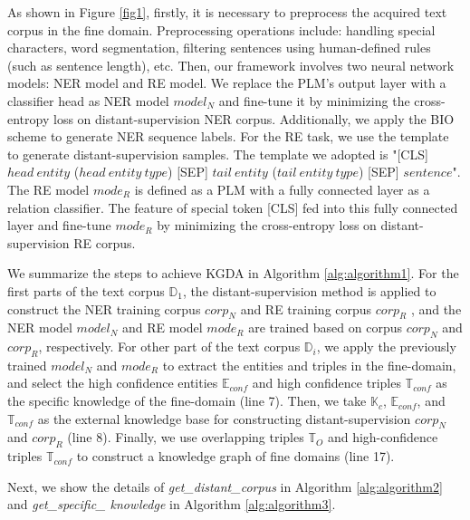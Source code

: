 \documentclass[sigconf]{acmart}
\begin{document}
As shown in Figure \ref{fig1}, firstly, it is necessary to preprocess the acquired text corpus in the fine domain. Preprocessing operations include: handling special characters, word segmentation, filtering sentences using human-defined rules (such as sentence length), etc. Then, our framework involves two neural network models: NER model and RE model. We replace the PLM’s output layer with a classifier head as  NER model $model_N$ and fine-tune it by minimizing the cross-entropy loss on distant-supervision NER corpus. Additionally, we apply the BIO scheme \cite{li2012joint} to generate NER sequence labels. For the RE task, we use the template to generate distant-supervision samples. The template we adopted is "[CLS] $head\ entity$ ($head\ entity\ type$) [SEP] $tail\ entity$ ($tail\ entity\ type$) [SEP] $sentence$". The RE model $mode_R$ is defined as a PLM with a fully connected layer as a relation classifier. The feature of special token [CLS]  fed into this fully connected layer and fine-tune $mode_R$ by minimizing the cross-entropy loss on distant-supervision RE corpus.

We summarize the steps to achieve KGDA in Algorithm  \ref{alg:algorithm1}. For the first parts of the text corpus $\mathbb{D}_1$, the distant-supervision method is applied to construct the NER training corpus $corp_N$ and RE training corpus $corp_R$ , and the NER model $model_N$ and RE model $mode_R$ are trained based on corpus $corp_N$ and $corp_R$, respectively. For other part of the text corpus $\mathbb{D}_i$,  we apply the previously trained $model_N$ and $mode_R$ to extract the entities and triples in the fine-domain, and select the  high confidence entities $\mathbb{E}_{conf}$ and  high confidence triples $\mathbb{T}_{conf}$ as the specific knowledge of the fine-domain (line 7). Then, we take $\mathbb{K}_c$, $\mathbb{E}_{conf}$, and $\mathbb{T}_{conf}$  as the external knowledge base for constructing distant-supervision $corp_N$ and $corp_R$ (line 8). Finally, we use overlapping triples $\mathbb{T}_O$ and high-confidence triples $\mathbb{T}_{conf}$  to construct a knowledge graph of fine domains (line 17).

Next, we show the details of \textit{get\_distant\_corpus} in Algorithm \ref{alg:algorithm2} and \textit{get\_specific\_ knowledge} in Algorithm \ref{alg:algorithm3}.
\end{document}
